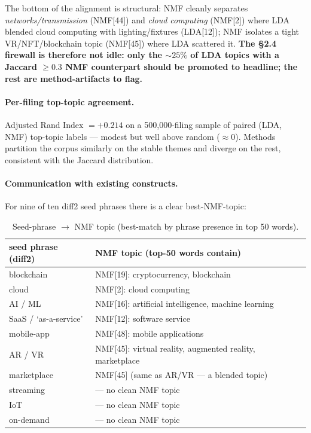 \documentclass[11pt]{article}
\begin{document}
\noindent The bottom of the alignment is structural: NMF cleanly separates
\emph{networks/transmission} (NMF[44]) and \emph{cloud computing} (NMF[2])
where LDA blended cloud computing with lighting/fixtures (LDA[12]); NMF
isolates a tight VR/NFT/blockchain topic (NMF[45]) where LDA scattered it.
\textbf{The §2.4 firewall is therefore not idle: only the $\sim 25\%$ of LDA
topics with a Jaccard $\geq 0.3$ NMF counterpart should be promoted to
headline; the rest are method-artifacts to flag.}

\paragraph{Per-filing top-topic agreement.} Adjusted Rand Index $=+0.214$ on a
500{,}000-filing sample of paired (LDA, NMF) top-topic labels --- modest but
well above random ($\approx 0$). Methods partition the corpus similarly on
the stable themes and diverge on the rest, consistent with the Jaccard
distribution.

\paragraph{Communication with existing constructs.} For nine of ten diff2 seed
phrases there is a clear best-NMF-topic:

\begin{table}[h]\centering\small
\caption{Seed-phrase $\to$ NMF topic (best-match by phrase presence in top 50 words).}
\begin{tabular}{ll}
\toprule
seed phrase (diff2) & NMF topic (top-50 words contain) \\
\midrule
blockchain    & NMF[19]: cryptocurrency, blockchain \\
cloud         & NMF[2]: cloud computing \\
AI / ML       & NMF[16]: artificial intelligence, machine learning \\
SaaS / `as-a-service' & NMF[12]: software service \\
mobile-app    & NMF[48]: mobile applications \\
AR / VR       & NMF[45]: virtual reality, augmented reality, marketplace \\
marketplace   & NMF[45] (same as AR/VR --- a blended topic) \\
streaming     & --- no clean NMF topic \\
IoT           & --- no clean NMF topic \\
on-demand     & --- no clean NMF topic \\
\bottomrule
\end{tabular}
\end{table}
\end{document}
